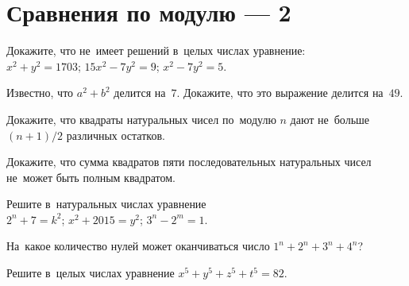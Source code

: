 
\section*{Сравнения по модулю --- 2}


\begin{problems}

\item
Докажите, что не~имеет решений в~целых числах уравнение:
\\
\subproblem $x^2 + y^2 = 1703$;
\qquad
\subproblem $15x^2 - 7y^2 = 9$;
\qquad
\subproblem $x^2 - 7y^2 = 5$.

\item
Известно, что $a^2 + b^2$ делится на~$7$.
Докажите, что это выражение делится на~$49$.

\item
Докажите, что квадраты натуральных чисел по~модулю $n$ дают не~больше
$(n + 1) / 2$ различных остатков.

\item
Докажите, что сумма квадратов пяти последовательных натуральных чисел не~может
быть полным квадратом.

\item
Решите в~натуральных числах уравнение 
\\
\subproblem $2^n + 7 = k^2$;
\qquad
\subproblem $x^2 + 2015 = y^2$;
\qquad
\subproblem $3^n - 2^m = 1$.

\item
На~какое количество нулей может оканчиваться число $1^n + 2^n + 3^n + 4^n$?

\item
Решите в~целых числах уравнение $x^5 + y^5 + z^5 + t^5 = 82$.

\end{problems}


